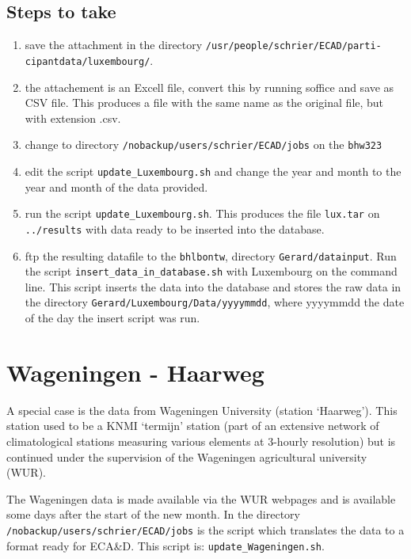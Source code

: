 \documentclass[a4paper]{article}
\begin{document}
\subsection*{Steps to take}

\begin{enumerate}
\item save the attachment in the directory \texttt{/usr/people/schrier/ECAD/parti-} \texttt{cipantdata/luxembourg/}.
\item the attachement is an Excell file, convert this by running soffice and save as CSV file. This produces
a file with the same name as the original file, but with extension .csv.
\item change to directory \texttt{/nobackup/users/schrier/ECAD/jobs} on the \texttt{bhw323}
\item edit the script \texttt{update\_Luxembourg.sh} and change the year and month to the year and month of
the data provided.  
\item run the script \texttt{update\_Luxembourg.sh}. This produces the file \texttt{lux.tar} on \texttt{../results} with data ready to be inserted into the database.
\item ftp the resulting datafile to the \texttt{bhlbontw},
directory \texttt{Gerard/datainput}. Run the script \texttt{insert\_data\_in\_database.sh} with Luxembourg
on the command line. This script inserts the data into the database and stores the raw
data in the directory \texttt{Gerard/Luxembourg/Data/yyyymmdd}, where yyyymmdd the date of the day the insert
script was run.
\end{enumerate}


\section{Wageningen - Haarweg}

A special case is the data from Wageningen University (station `Haarweg'). This station used to be a
KNMI `termijn' station (part of an extensive network of climatological stations measuring various
elements at 3-hourly resolution) but is continued under the supervision of the Wageningen agricultural
university (WUR).

The Wageningen data is made available via the WUR webpages and is available some days after the start
of the new month.
In the directory
\texttt{/nobackup/users/schrier/ECAD/jobs} is the script which translates the data to
a  format ready for ECA\&D.
This script is: \texttt{update\_Wageningen.sh}.
\end{document}
